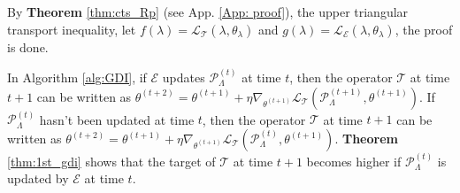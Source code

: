 \begin{Proof}
    By \textbf{Theorem} \ref{thm:cts_Rp} (see App. \ref{App: proof}), the upper triangular transport inequality, 
    let $f(\lambda) = \mathcal{L}_{\mathcal{T}} (\lambda, \theta_{\lambda})$ and 
    $g(\lambda) = \mathcal{L}_{\mathcal{E}} (\lambda, \theta_{\lambda})$,
    the proof is done.
\end{Proof}

\begin{Remark}
     In Algorithm \ref{alg:GDI}, if $\mathcal{E}$ updates $\mathcal{P}_{\Lambda}^{(t)}$ at time $t$, then the operator $\mathcal{T}$ at time $t+1$ can be written as $\theta^{(t+2)} = \theta^{(t+1)} + \eta \nabla_{\theta^{(t+1)}} \mathcal{L}_{\mathcal{T}} (\mathcal{P}_{\Lambda}^{(t+1)}, \theta^{(t+1)})$.
     If $\mathcal{P}_{\Lambda}^{(t)}$ hasn't been updated at time $t$, then the operator $\mathcal{T}$ at time $t+1$ can be written as $\theta^{(t+2)} = \theta^{(t+1)} + \eta \nabla_{\theta^{(t+1)}} \mathcal{L}_{\mathcal{T}} (\mathcal{P}_{\Lambda}^{(t)}, \theta^{(t+1)})$.
     \textbf{Theorem} \ref{thm:1st_gdi} shows that the target of $\mathcal{T}$ at time $t+1$ becomes higher if $\mathcal{P}_{\Lambda}^{(t)}$ is updated by $\mathcal{E}$ at time $t$.
\end{Remark}


